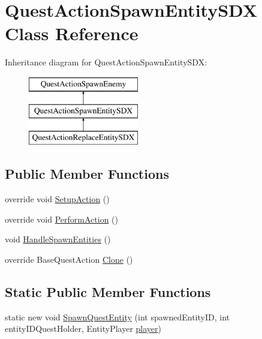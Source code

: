 \hypertarget{class_quest_action_spawn_entity_s_d_x}{}\section{Quest\+Action\+Spawn\+Entity\+S\+DX Class Reference}
\label{class_quest_action_spawn_entity_s_d_x}
Inheritance diagram for Quest\+Action\+Spawn\+Entity\+S\+DX\+:\begin{figure}[H]
\begin{center}
\leavevmode
\includegraphics[height=3.000000cm]{class_quest_action_spawn_entity_s_d_x}
\end{center}
\end{figure}
\subsection*{Public Member Functions}
\begin{DoxyCompactItemize}
\item 
override void \mbox{\hyperlink{class_quest_action_spawn_entity_s_d_x_a6902fc3d884ca3eb9a19566a1db9ca6e}{Setup\+Action}} ()
\item 
override void \mbox{\hyperlink{class_quest_action_spawn_entity_s_d_x_a06bb80d9e1e195fec2597394731df71f}{Perform\+Action}} ()
\item 
void \mbox{\hyperlink{class_quest_action_spawn_entity_s_d_x_af16565ac6f58bf902a6b0168b903a48d}{Handle\+Spawn\+Entities}} ()
\item 
override Base\+Quest\+Action \mbox{\hyperlink{class_quest_action_spawn_entity_s_d_x_a6570686aa37e4c410fd434769dae7753}{Clone}} ()
\end{DoxyCompactItemize}
\subsection*{Static Public Member Functions}
\begin{DoxyCompactItemize}
\item 
static new void \mbox{\hyperlink{class_quest_action_spawn_entity_s_d_x_a2957c925945eab011f79267d9dfe739f}{Spawn\+Quest\+Entity}} (int spawned\+Entity\+ID, int entity\+I\+D\+Quest\+Holder, Entity\+Player \mbox{\hyperlink{_sphere_i_i_01_music_01_boxes_2_config_2_localization_8txt_a4e2cb8aeff651600ea1cc57fe5a929a4}{player}})
\end{DoxyCompactItemize}


